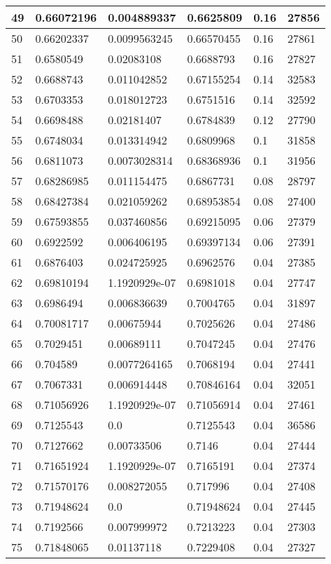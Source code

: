 \begin{longtable}{|l|l|l|l|l|l|}
49 & 0.66072196 & 0.004889337 & 0.6625809 & 0.16 & 27856 \\ \hline 
50 & 0.66202337 & 0.0099563245 & 0.66570455 & 0.16 & 27861 \\ \hline 
51 & 0.6580549 & 0.02083108 & 0.6688793 & 0.16 & 27827 \\ \hline 
52 & 0.6688743 & 0.011042852 & 0.67155254 & 0.14 & 32583 \\ \hline 
53 & 0.6703353 & 0.018012723 & 0.6751516 & 0.14 & 32592 \\ \hline 
54 & 0.6698488 & 0.02181407 & 0.6784839 & 0.12 & 27790 \\ \hline 
55 & 0.6748034 & 0.013314942 & 0.6809968 & 0.1 & 31858 \\ \hline 
56 & 0.6811073 & 0.0073028314 & 0.68368936 & 0.1 & 31956 \\ \hline 
57 & 0.68286985 & 0.011154475 & 0.6867731 & 0.08 & 28797 \\ \hline 
58 & 0.68427384 & 0.021059262 & 0.68953854 & 0.08 & 27400 \\ \hline 
59 & 0.67593855 & 0.037460856 & 0.69215095 & 0.06 & 27379 \\ \hline 
60 & 0.6922592 & 0.006406195 & 0.69397134 & 0.06 & 27391 \\ \hline 
61 & 0.6876403 & 0.024725925 & 0.6962576 & 0.04 & 27385 \\ \hline 
62 & 0.69810194 & 1.1920929e-07 & 0.6981018 & 0.04 & 27747 \\ \hline 
63 & 0.6986494 & 0.006836639 & 0.7004765 & 0.04 & 31897 \\ \hline 
64 & 0.70081717 & 0.00675944 & 0.7025626 & 0.04 & 27486 \\ \hline 
65 & 0.7029451 & 0.00689111 & 0.7047245 & 0.04 & 27476 \\ \hline 
66 & 0.704589 & 0.0077264165 & 0.7068194 & 0.04 & 27441 \\ \hline 
67 & 0.7067331 & 0.006914448 & 0.70846164 & 0.04 & 32051 \\ \hline 
68 & 0.71056926 & 1.1920929e-07 & 0.71056914 & 0.04 & 27461 \\ \hline 
69 & 0.7125543 & 0.0 & 0.7125543 & 0.04 & 36586 \\ \hline 
70 & 0.7127662 & 0.00733506 & 0.7146 & 0.04 & 27444 \\ \hline 
71 & 0.71651924 & 1.1920929e-07 & 0.7165191 & 0.04 & 27374 \\ \hline 
72 & 0.71570176 & 0.008272055 & 0.717996 & 0.04 & 27408 \\ \hline 
73 & 0.71948624 & 0.0 & 0.71948624 & 0.04 & 27445 \\ \hline 
74 & 0.7192566 & 0.007999972 & 0.7213223 & 0.04 & 27303 \\ \hline 
75 & 0.71848065 & 0.01137118 & 0.7229408 & 0.04 & 27327 \\ \hline 
\end{longtable}